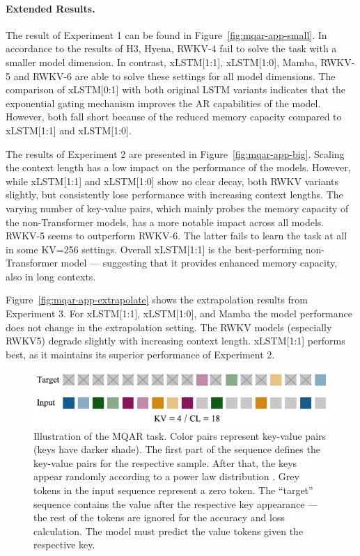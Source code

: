 \documentclass[dvipsnames]{article}
\begin{document}
\begin{appendix}
\paragraph{Extended Results.}

The result of Experiment 1 can be found in Figure~\ref{fig:mqar-app-small}. 
In accordance to the results of \citet{Arora:23arxiv} H3, Hyena, RWKV-4 
fail to solve the task with a smaller model dimension. 
In contrast, xLSTM[1:1], xLSTM[1:0], Mamba, RWKV-5 and RWKV-6 are able 
to solve these settings for all model dimensions.
The comparison of xLSTM[0:1] with both original LSTM variants indicates 
that the exponential gating mechanism improves the AR capabilities of the model.
However, both fall short because of the reduced memory capacity compared to xLSTM[1:1] and xLSTM[1:0].

The results of Experiment 2 are presented in Figure~\ref{fig:mqar-app-big}.
Scaling the context length has a low impact on the performance of the models. 
However, while xLSTM[1:1] and xLSTM[1:0] show no clear decay, 
both RWKV variants slightly, but consistently lose performance with increasing context lengths.
The varying number of key-value pairs,
which mainly probes the memory capacity of the non-Transformer models, 
has a more notable impact across all models.
RWKV-5 seems to outperform RWKV-6. The latter fails to learn the task at all in some KV=256 settings.
Overall xLSTM[1:1] is the best-performing non-Transformer 
model --- suggesting that it provides enhanced memory capacity, also in long contexts.

Figure~\ref{fig:mqar-app-extrapolate} shows the extrapolation results from Experiment 3.
For xLSTM[1:1], xLSTM[1:0], and Mamba the model performance 
does not change in the extrapolation setting. The RWKV models (especially RWKV5) degrade 
slightly with increasing context length.
xLSTM[1:1] performs best, as it maintains its superior performance of Experiment 2.

\begin{figure}[h]
\includegraphics[width=\textwidth]{figures/MQR.pdf}
\caption{Illustration of the MQAR task. Color pairs represent key-value pairs (keys have darker shade). The first part of the sequence defines the key-value pairs for the respective sample. After that, the keys appear randomly according to a power law distribution \protect\footnotemark. Grey tokens in the input sequence represent a zero token. The ``target'' sequence contains the value after the respective key appearance --- the rest of the tokens are ignored for the accuracy and loss calculation. The model must predict the value tokens given the respective key.}
\label{fig:mqr}
\end{figure}



\end{appendix}
\end{document}
